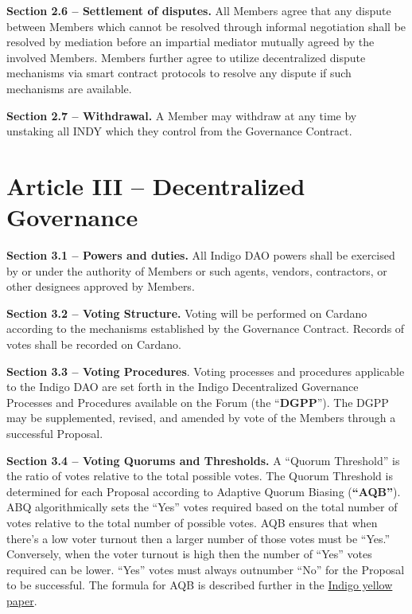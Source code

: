 \textbf{Section 2.6 -- Settlement of disputes.} All Members agree that
any dispute between Members which cannot be resolved through informal
negotiation shall be resolved by mediation before an impartial mediator
mutually agreed by the involved Members. Members further agree to
utilize decentralized dispute mechanisms via smart contract protocols to
resolve any dispute if such mechanisms are available.

\textbf{Section 2.7 -- Withdrawal.} A Member may withdraw at any time by
unstaking all INDY which they control from the Governance Contract.

\hypertarget{article-iii-decentralized-governance}{%
\section{Article III -- Decentralized
Governance}\label{article-iii-decentralized-governance}}

\textbf{Section 3.1 -- Powers and duties.} All Indigo DAO powers shall
be exercised by or under the authority of Members or such agents,
vendors, contractors, or other designees approved by Members.

\textbf{Section 3.2 -- Voting Structure.} Voting will be performed on
Cardano according to the mechanisms established by the Governance
Contract. Records of votes shall be recorded on Cardano.

\textbf{Section 3.3 -- Voting Procedures}. Voting processes and
procedures applicable to the Indigo DAO are set forth in the Indigo
Decentralized Governance Processes and Procedures available on the Forum
(the ``\textbf{DGPP}''). The DGPP may be supplemented, revised, and
amended by vote of the Members through a successful Proposal.

\textbf{Section 3.4 -- Voting Quorums and Thresholds.} A ``Quorum
Threshold'' is the ratio of votes relative to the total possible votes.
The Quorum Threshold is determined for each Proposal according to
Adaptive Quorum Biasing (\textbf{``AQB''}). ABQ algorithmically sets the
``Yes'' votes required based on the total number of votes relative to
the total number of possible votes. AQB ensures that when there's a low
voter turnout then a larger number of those votes must be ``Yes.''
Conversely, when the voter turnout is high then the number of ``Yes''
votes required can be lower. ``Yes'' votes must always outnumber ``No''
for the Proposal to be successful. The formula for AQB is described
further in the \href{https://indigoprotocol.io/yellowpaper}{Indigo
yellow paper}.

